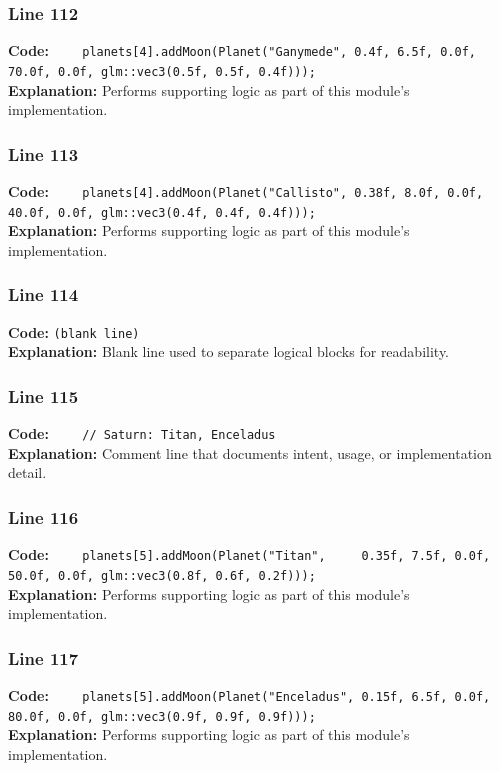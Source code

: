 \documentclass[11pt,a4paper]{article}
\begin{document}
\subsubsection*{Line 112}
\textbf{Code:} \verb|    planets[4].addMoon(Planet("Ganymede", 0.4f, 6.5f, 0.0f, 70.0f, 0.0f, glm::vec3(0.5f, 0.5f, 0.4f)));|\\
\textbf{Explanation:} Performs supporting logic as part of this module's implementation.

\subsubsection*{Line 113}
\textbf{Code:} \verb|    planets[4].addMoon(Planet("Callisto", 0.38f, 8.0f, 0.0f, 40.0f, 0.0f, glm::vec3(0.4f, 0.4f, 0.4f)));|\\
\textbf{Explanation:} Performs supporting logic as part of this module's implementation.

\subsubsection*{Line 114}
\textbf{Code:} \texttt{(blank line)}\\
\textbf{Explanation:} Blank line used to separate logical blocks for readability.

\subsubsection*{Line 115}
\textbf{Code:} \verb|    // Saturn: Titan, Enceladus|\\
\textbf{Explanation:} Comment line that documents intent, usage, or implementation detail.

\subsubsection*{Line 116}
\textbf{Code:} \verb|    planets[5].addMoon(Planet("Titan",     0.35f, 7.5f, 0.0f, 50.0f, 0.0f, glm::vec3(0.8f, 0.6f, 0.2f)));|\\
\textbf{Explanation:} Performs supporting logic as part of this module's implementation.

\subsubsection*{Line 117}
\textbf{Code:} \verb|    planets[5].addMoon(Planet("Enceladus", 0.15f, 6.5f, 0.0f, 80.0f, 0.0f, glm::vec3(0.9f, 0.9f, 0.9f)));|\\
\textbf{Explanation:} Performs supporting logic as part of this module's implementation.
\end{document}

